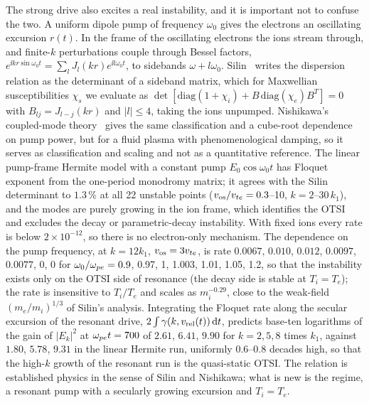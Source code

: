 The strong drive also excites a real instability, and it is important not to confuse the two. A uniform dipole pump of frequency $\omega_0$ gives the electrons an oscillating excursion $r(t)$. In the frame of the oscillating electrons the ions stream through, and finite-$k$ perturbations couple through Bessel factors, $e^{\ii kr\sin\omega_0t}=\sum_lJ_l(kr)e^{\ii l\omega_0t}$, to sidebands $\omega+l\omega_0$. Silin~\cite{Silin1965} writes the dispersion relation as the determinant of a sideband matrix, which for Maxwellian susceptibilities $\chi_s$ we evaluate as $\det[\mathrm{diag}(1+\chi_i)+B\,\mathrm{diag}(\chi_e)B^T]=0$ with $B_{lj}=J_{l-j}(kr)$ and $|l|\le4$, taking the ions unpumped. Nishikawa's coupled-mode theory~\cite{Nishikawa1968a,Nishikawa1968b} gives the same classification and a cube-root dependence on pump power, but for a fluid plasma with phenomenological damping, so it serves as classification and scaling and not as a quantitative reference. The linear pump-frame Hermite model with a constant pump $E_0\cos\omega_0t$ has Floquet exponent from the one-period monodromy matrix; it agrees with the Silin determinant to $1.3\,\%$ at all 22 unstable points ($v_{\rm os}/v_{te}=0.3$--10, $k=2$--$30\,k_1$), and the modes are purely growing in the ion frame, which identifies the OTSI and excludes the decay or parametric-decay instability. With fixed ions every rate is below $2\times10^{-12}$, so there is no electron-only mechanism. The dependence on the pump frequency, at $k=12k_1$, $v_{\rm os}=3v_{te}$, is rate $0.0067$, $0.010$, $0.012$, $0.0097$, $0.0077$, $0$, $0$ for $\omega_0/\omega_{pe}=0.9$, 0.97, 1, 1.003, 1.01, 1.05, 1.2, so that the instability exists only on the OTSI side of resonance (the decay side is stable at $T_i=T_e$); the rate is insensitive to $T_i/T_e$ and scales as $m_i^{-0.29}$, close to the weak-field $(m_e/m_i)^{1/3}$ of Silin's analysis. Integrating the Floquet rate along the secular excursion of the resonant drive, $2\int\gamma(k,v_{\rm rel}(t))\,\mathrm{d} t$, predicts base-ten logarithms of the gain of $|E_k|^2$ at $\omega_{pe} t=700$ of $2.61$, $6.41$, $9.90$ for $k=2,5,8$ times $k_1$, against $1.80$, $5.78$, $9.31$ in the linear Hermite run, uniformly $0.6$--$0.8$ decades high, so that the high-$k$ growth of the resonant run is the quasi-static OTSI. The relation is established physics in the sense of Silin and Nishikawa; what is new is the regime, a resonant pump with a secularly growing excursion and $T_i=T_e$.

